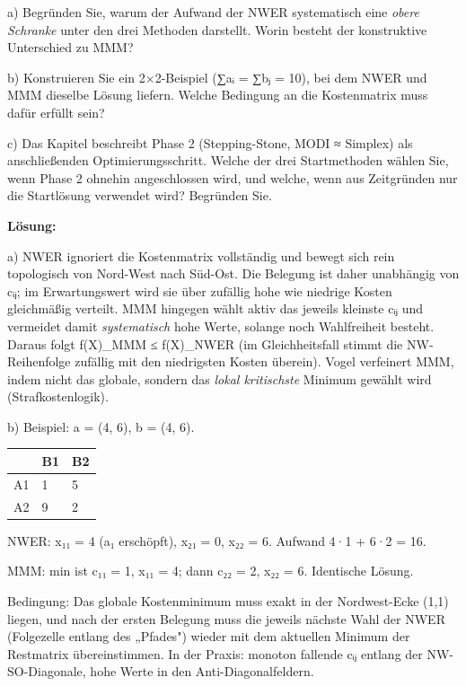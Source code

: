 \documentclass[11pt, a4paper]{article}
\begin{document}
a) Begründen Sie, warum der Aufwand der NWER systematisch eine \textit{obere Schranke} unter den drei Methoden darstellt. Worin besteht der konstruktive Unterschied zu MMM?

b) Konstruieren Sie ein 2×2-Beispiel (∑aᵢ = ∑bⱼ = 10), bei dem NWER und MMM dieselbe Lösung liefern. Welche Bedingung an die Kostenmatrix muss dafür erfüllt sein?

c) Das Kapitel beschreibt Phase 2 (Stepping-Stone, MODI ≈ Simplex) als anschließenden Optimierungsschritt. Welche der drei Startmethoden wählen Sie, wenn Phase 2 ohnehin angeschlossen wird, und welche, wenn aus Zeitgründen nur die Startlösung verwendet wird? Begründen Sie.


\textbf{Lösung:}


a) NWER ignoriert die Kostenmatrix vollständig und bewegt sich rein topologisch von Nord-West nach Süd-Ost. Die Belegung ist daher unabhängig von cᵢⱼ; im Erwartungswert wird sie über zufällig hohe wie niedrige Kosten gleichmäßig verteilt. MMM hingegen wählt aktiv das jeweils kleinste cᵢⱼ und vermeidet damit \textit{systematisch} hohe Werte, solange noch Wahlfreiheit besteht. Daraus folgt f(X)\_MMM ≤ f(X)\_NWER (im Gleichheitsfall stimmt die NW-Reihenfolge zufällig mit den niedrigsten Kosten überein). Vogel verfeinert MMM, indem nicht das globale, sondern das \textit{lokal kritischste} Minimum gewählt wird (Strafkostenlogik).


b) Beispiel: a = (4, 6), b = (4, 6).



{\small
\begin{tabularx}{\linewidth}{XXX}
\hline
\rowcolor{tableheadbg}
{\color{white}\textbf{}} & {\color{white}\textbf{B1}} & {\color{white}\textbf{B2}} \\[2pt]
\hline
\endhead
\hline
\endfoot
A1 & 1 & 5 \\
A2 & 9 & 2 \\
\end{tabularx}
}


NWER: x₁₁ = 4 (a₁ erschöpft), x₂₁ = 0, x₂₂ = 6. Aufwand 4·1 + 6·2 = 16.

MMM: min ist c₁₁ = 1, x₁₁ = 4; dann c₂₂ = 2, x₂₂ = 6. Identische Lösung.


Bedingung: Das globale Kostenminimum muss exakt in der Nordwest-Ecke (1,1) liegen, und nach der ersten Belegung muss die jeweils nächste Wahl der NWER (Folgezelle entlang des „Pfades") wieder mit dem aktuellen Minimum der Restmatrix übereinstimmen. In der Praxis: monoton fallende cᵢⱼ entlang der NW-SO-Diagonale, hohe Werte in den Anti-Diagonalfeldern.
\end{document}
